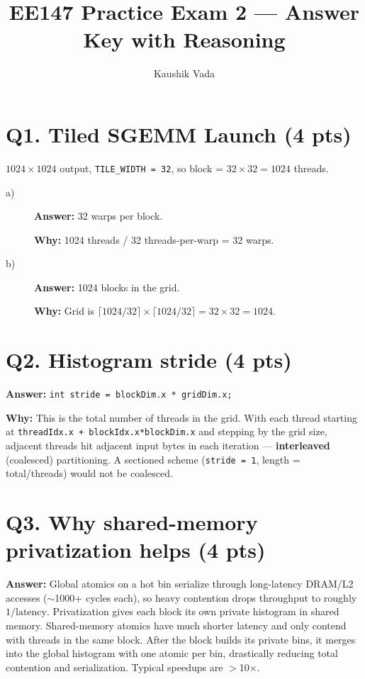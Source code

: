 \documentclass[11pt]{article}
\title{\vspace{-1.5em}\textbf{EE147 Practice Exam 2 — Answer Key with Reasoning}}
\author{Kaushik Vada}
\date{}
\newcommand{\ans}[1]{\par\noindent\textcolor{anscolor}{\textbf{Answer:}} #1\par}
\newcommand{\why}[1]{\par\noindent\textcolor{anscolor}{\textbf{Why:}} #1\par\vspace{4pt}}
\begin{document}
\maketitle
\vspace{-2em}

\section*{Q1. Tiled SGEMM Launch (4 pts)}
$1024 \times 1024$ output, \texttt{TILE\_WIDTH = 32}, so block = $32 \times 32 = 1024$ threads.
\begin{description}
  \item[a)] \ans{32 warps per block.}
        \why{1024 threads / 32 threads-per-warp = 32 warps.}
  \item[b)] \ans{1024 blocks in the grid.}
        \why{Grid is $\lceil 1024/32 \rceil \times \lceil 1024/32 \rceil = 32 \times 32 = 1024$.}
\end{description}

\section*{Q2. Histogram stride (4 pts)}
\ans{\texttt{int stride = blockDim.x * gridDim.x;}}
\why{This is the total number of threads in the grid. With each thread starting at
\texttt{threadIdx.x + blockIdx.x*blockDim.x} and stepping by the grid size, adjacent threads
hit adjacent input bytes in each iteration — \textbf{interleaved} (coalesced) partitioning.
A sectioned scheme (\texttt{stride = 1}, length = total/threads) would not be coalesced.}

\section*{Q3. Why shared-memory privatization helps (4 pts)}
\ans{Global atomics on a hot bin serialize through long-latency DRAM/L2 accesses
($\sim$1000+ cycles each), so heavy contention drops throughput to roughly
$1/\text{latency}$. Privatization gives each block its own private histogram in shared
memory. Shared-memory atomics have much shorter latency and only contend with threads in the
same block. After the block builds its private bins, it merges into the global histogram with
one atomic per bin, drastically reducing total contention and serialization. Typical speedups
are $>$10$\times$.}
\end{document}

